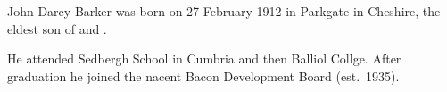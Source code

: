 
John Darcy Barker was born on 27 February 1912 in Parkgate in Cheshire, the eldest son of  and .\cite{BalliolRegister1931, JDBarkerBirth}

He attended Sedbergh School in Cumbria and then Balliol Collge. After graduation he joined the nacent Bacon Development Board (est.~1935).\cite{BalliolRegister1931}
